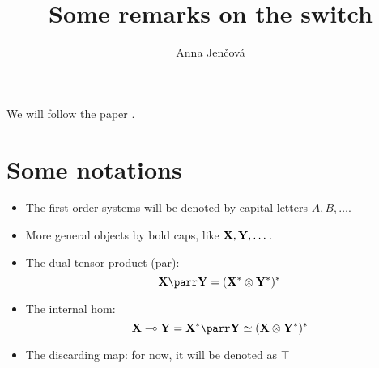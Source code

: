 \documentclass[12pt]{article}
\title{Some remarks on the switch}
\author{Anna Jen\v cov\'a}
\theoremstyle{definition}
\theoremstyle{remark}
\begin{document}
\maketitle

We will follow the paper \cite{kissinger2016acategorical}.

\section{Some notations}

\begin{itemize}
\item The first order systems will be denoted by capital letters $A,B,\dots$. 
\item More general
objects by bold caps, like $\bf{X,Y},\dots$.
\item The dual tensor product (par): 
\[
\bf{X} \parr \bf{Y}=(\bf X^*\otimes \bf Y^*)^*
\]
\item The internal hom: 
\[
\bf X\multimap \bf Y= \bf X^*\parr \bf Y\simeq (\bf X\otimes \bf
Y^*)^*
\]
\item The discarding map: for now, it will be denoted as $\top$
\end{itemize}
\end{document}
